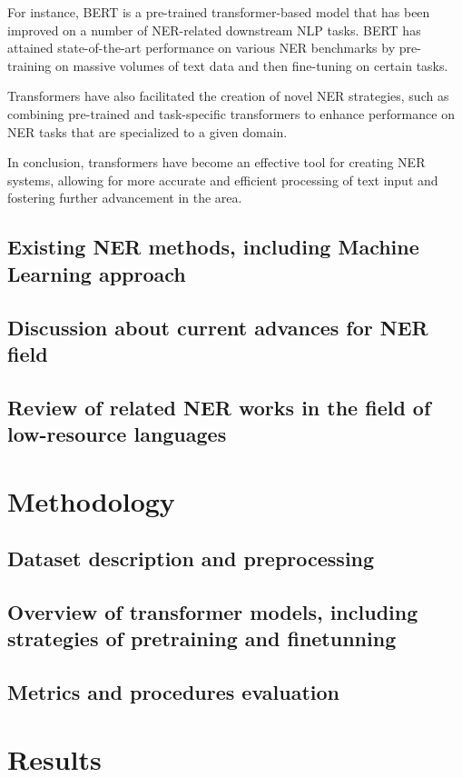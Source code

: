 \documentclass[a4paper,12pt]{report}
\begin{document}
\par
For instance, BERT is a pre-trained transformer-based model that has been improved on a number of NER-related downstream NLP tasks. BERT has attained state-of-the-art performance on various NER benchmarks by pre-training on massive volumes of text data and then fine-tuning on certain tasks.
\par
Transformers have also facilitated the creation of novel NER strategies, such as combining pre-trained and task-specific transformers to enhance performance on NER tasks that are specialized to a given domain.
\par
In conclusion, transformers have become an effective tool for creating NER systems, allowing for more accurate and efficient processing of text input and fostering further advancement in the area.
\section{Existing NER methods, including Machine Learning approach}
\section{Discussion about current advances for NER field}
\section{Review of related NER works in the field of low-resource languages}


\chapter{Methodology}\label{cap:methodology}
\section{Dataset description and preprocessing}
\section{Overview of transformer models, including strategies of pretraining and finetunning}
\section{Metrics and procedures evaluation}


\chapter{Results}\label{cap:results}
\end{document}
